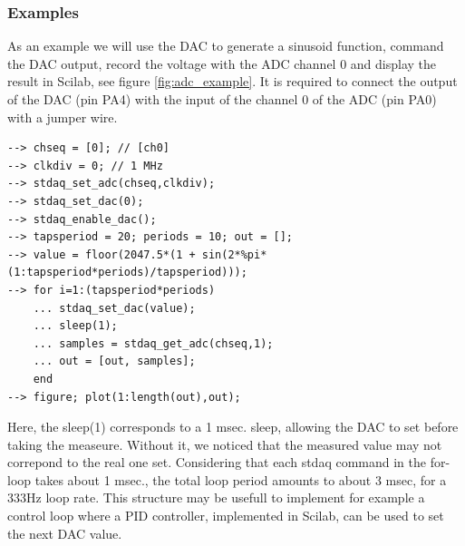 \documentclass[letterpaper,10pt,english]{hitec}
\begin{document}
\subsubsection{Examples}

As an example we will use the DAC to generate a sinusoid function, command the DAC output, record the voltage with the ADC channel 0 and display the result in Scilab, see figure \ref{fig:adc_example}.
It is required to connect the output of the DAC (pin PA4) with the input of the channel 0 of the ADC (pin PA0) with a jumper wire.

\begin{verbatim}
--> chseq = [0]; // [ch0]
--> clkdiv = 0; // 1 MHz
--> stdaq_set_adc(chseq,clkdiv);
--> stdaq_set_dac(0);
--> stdaq_enable_dac();
--> tapsperiod = 20; periods = 10; out = [];
--> value = floor(2047.5*(1 + sin(2*%pi*(1:tapsperiod*periods)/tapsperiod)));
--> for i=1:(tapsperiod*periods)
    ... stdaq_set_dac(value);
    ... sleep(1);
    ... samples = stdaq_get_adc(chseq,1);
    ... out = [out, samples];
    end
--> figure; plot(1:length(out),out);
\end{verbatim}
Here, the sleep(1) corresponds to a 1 msec. sleep, allowing the DAC to set before taking the measeure. Without it, we noticed that the measured value may not correpond to the real one set.
Considering that each stdaq command in the for-loop takes about 1 msec., the total loop period amounts to about 3 msec, for a 333Hz loop rate. This structure may be usefull to implement for example a control loop where a PID controller, implemented in Scilab, can be used to set the next DAC value.
\end{document}
